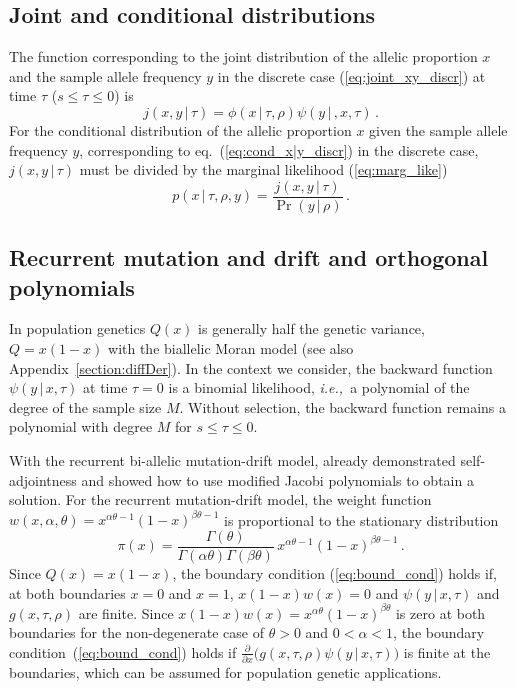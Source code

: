 \documentclass[preprint]{elsarticle}
\newcommand\given{{\,|\,}}
\newcommand\ie{{\it i.e.,}}
\newcommand\y{\ensuremath{y}}
\begin{document}
\subsection{Joint and conditional distributions}

The function corresponding to the joint distribution of the allelic proportion $x$ and the sample allele frequency $\y$ in the discrete case  (\ref{eq:joint_xy_discr}) at time $\tau$ ($s \le \tau \le 0$) is
\begin{equation}\label{eq:joint_x_y}
j(x,\y \given \tau)= \phi(x\given \tau,\rho)\psi(\y\given,x,\tau)\,.
\end{equation}
For the conditional distribution of the allelic proportion $x$ given the sample allele frequency $y$, corresponding to eq.~(\ref{eq:cond_x|y_discr}) in the discrete case, $j(x,\y \given \tau)$ must be divided by the marginal likelihood (\ref{eq:marg_like})
\begin{equation}\label{eq:cond_x|y}
p(x\given \tau,\rho,\y)= \frac{j(x,\y\given \tau)}{\Pr(y\given \rho)}\,.
\end{equation}

\subsection{Recurrent mutation and drift and orthogonal polynomials}

In population genetics $Q(x)$ is generally half the genetic variance, $Q=x(1-x)$ with the biallelic Moran model (see also Appendix~\ref{section:diffDer}). In the context we consider, the backward function $\psi(\y\given x,\tau)$ at time $\tau=0$ is a binomial likelihood, \ie\ a polynomial of the degree of the sample size $M$. Without selection, the backward function remains a polynomial with degree $M$ for $s\leq \tau\leq 0$. 

With the recurrent bi-allelic mutation-drift model, \citet{Song12} already demonstrated self-adjointness and showed how to use modified Jacobi polynomials to obtain a solution. For the recurrent mutation-drift model, the weight function $w(x,\alpha,\theta)=x^{\alpha\theta-1}(1-x)^{\beta\theta-1}$ is proportional to the stationary distribution 
\begin{equation}
    \pi(x)=\frac{\Gamma(\theta)}{\Gamma(\alpha\theta)\Gamma(\beta\theta)}\,x^{\alpha\theta-1}(1-x)^{\beta\theta-1}\,.
\end{equation}
Since $Q(x)=x(1-x)$, the boundary condition (\ref{eq:bound_cond}) holds if, at both boundaries $x=0$ and $x=1$, $x(1-x)w(x)=0$ and  $\psi(\y\given x,\tau)$ and $g(x,\tau,\rho)$ are finite. Since  $x(1-x)w(x)= x^{\alpha\theta}(1-x)^{\beta\theta}$ is zero at both boundaries for the non-degenerate case of $\theta>0$ and $0<\alpha<1$, the boundary condition~(\ref{eq:bound_cond}) holds if $\frac{\partial}{\partial x}\big(g(x,\tau,\rho)\psi(\y\given x,\tau))$ is finite at the boundaries, which can be assumed for population genetic applications. 
\end{document}
